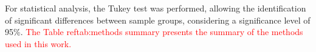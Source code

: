 For statistical analysis, the Tukey test was performed, allowing the identification of significant differences between sample groups, considering a significance level of 95\%.
\textcolor{red}{The Table reftab:methods summary presents the summary of the methods used in this work.}








